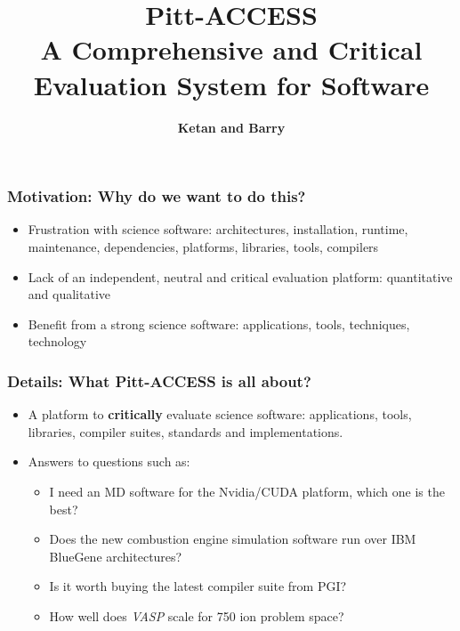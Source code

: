 \documentclass[hyperref={pdfpagelabels=false},12pt]{beamer}
\title[Pitt Access]{{\large Pitt-ACCESS\\ A Comprehensive and Critical Evaluation System for Software}}
\author[Pitt-Access]{{\scriptsize \textbf{Ketan and Barry}}}
\date{}
\begin{document}
\begin{frame}[plain]
\titlepage
\end{frame}

\begin{frame}
\frametitle{Motivation: Why do we want to do this?}
\begin{itemize}
\itemsep1em
\item 
Frustration with science software: architectures, installation, runtime, maintenance, dependencies, platforms, libraries, tools, compilers
\item 
Lack of an independent, neutral and critical evaluation platform: quantitative and qualitative
\item 
Benefit from a strong science software: applications, tools, techniques, technology
\end{itemize}
\end{frame}

\begin{frame}
\frametitle{Details: What Pitt-ACCESS is all about?}
\begin{itemize}
\itemsep1em
\item 
A platform to \textbf{critically} evaluate science software: applications, tools, libraries, compiler suites, standards and implementations.
\item 
Answers to questions such as:
\begin{itemize}
\item 
I need an MD software for the Nvidia/CUDA platform, which one is the best?
\item 
Does the new combustion engine simulation software run over IBM BlueGene architectures?
\item 
Is it worth buying the latest compiler suite from PGI?
\item 
How well does \textit{VASP} scale for 750 ion problem space?
\end{itemize}
\end{itemize}

\end{frame}
\end{document}
